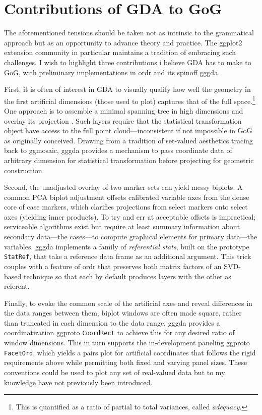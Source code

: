 \documentclass{vgtc}                          %
\newcommand{\pkg}[1]{\textsf{#1}}
\begin{document}
\section{Contributions of GDA to GoG}

The aforementioned tensions should be taken not as intrinsic to the grammatical approach but as an opportunity to advance theory and practice.
The \pkg{ggplot2} extension community in particular maintains a tradition of embracing such challenges.
I wish to highlight three contributions i believe GDA has to make to GoG, with preliminary implementations in \pkg{ordr} and its spinoff \pkg{gggda}.

First, it is often of interest in GDA to visually qualify how well the geometry in the first artificial dimensions (those used to plot) captures that of the full space.\footnote{This is quantified as a ratio of partial to total variances, called \emph{adequacy}.}
One approach is to assemble a minimal spanning tree in high dimensions and overlay its projection \cite{Jolliffe2002}.
Such layers require that the statistical transformation object have access to the full point cloud---inconsistent if not impossible in GoG as originally conceived.
Drawing from a tradition of set-valued aesthetics tracing back to \pkg{ggmosaic}, \pkg{gggda} provides a mechanism to pass coordinate data of arbitrary dimension for statistical transformation before projecting for geometric construction.

Second, the unadjusted overlay of two marker sets can yield messy biplots.
A common PCA biplot adjustment offsets calibrated variable axes from the dense core of case markers, which clarifies projections from select markers onto select axes (yielding inner products).
To try and err at acceptable offsets is impractical; serviceable algorithms exist but require at least summary information about secondary data---the cases---to compute graphical elements for primary data---the variables.
\pkg{gggda} implements a family of \emph{referential stats}, built on the prototype \texttt{StatRef}, that take a reference data frame as an additional argument.
This trick couples with a feature of \pkg{ordr} that preserves both matrix factors of an SVD-based technique so that each by default produces layers with the other as referent.

Finally, to evoke the common scale of the artificial axes and reveal differences in the data ranges between them, biplot windows are often made square, rather than truncated in each dimension to the data range.
\pkg{gggda} provides a coordinatization ggproto \texttt{CoordRect} to achieve this for any desired ratio of window dimensions.
This in turn supports the in-development paneling ggproto \texttt{FacetOrd}, which yields a pairs plot for artificial coordinates that follows the rigid requirements above while permitting both fixed and varying panel sizes.
These conventions could be used to plot any set of real-valued data but to my knowledge have not previously been introduced.
\end{document}

